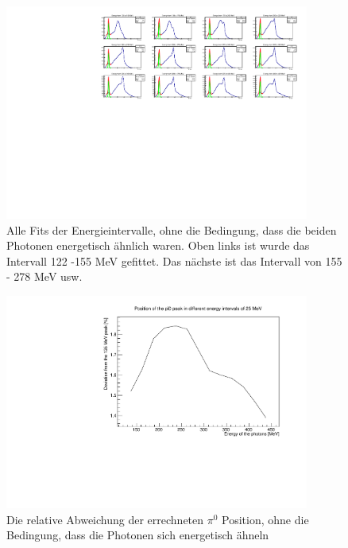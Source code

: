 \documentclass[a4paper,11pt,oneside,final,german,openbib,pdftex]{scrbook}
\begin{document}
{\begin{appendix}
\begin{figure}[h!]
	\begin{center}
		\includegraphics[width=100mm]{RealDataEnergyIntervalAllPhotonsAllFits}
		\caption{Alle Fits der Energieintervalle, ohne die Bedingung, dass die beiden Photonen energetisch ähnlich waren. Oben links ist wurde das Intervall 122 -155 MeV gefittet. Das nächste ist das Intervall von 155 - 278 MeV usw.}
		\label{fig:allenergyallfits}
	\end{center}
\end{figure}

\begin{figure}
	\begin{center}
		\includegraphics[width=100mm]{RealDataEnergyIntervalAllPhotonsRelativeDeviation}
		\caption{Die relative Abweichung der errechneten $\pi^0$ Position, ohne die Bedingung, dass die Photonen sich energetisch ähneln}
		\label{fig:Relative-Deviation-Energy-Interval-No-Condition}
	\end{center}
\end{figure}


\end{appendix}}
\end{document}
